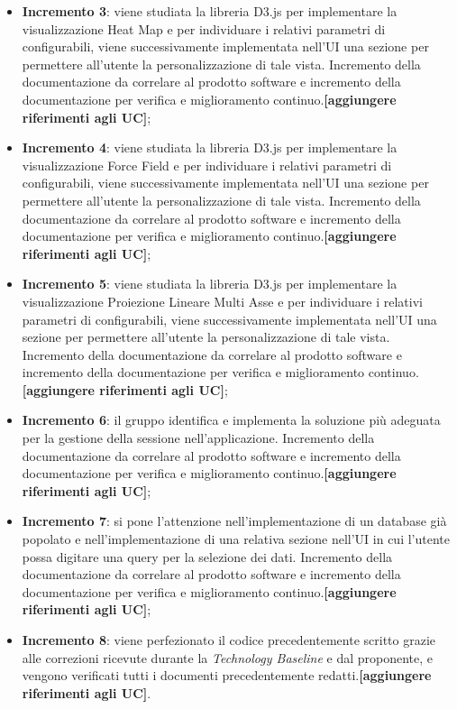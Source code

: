 \begin{itemize}
\begin{itemize}
	\item \textbf{Incremento 3}: viene studiata la libreria D3.js per implementare la visualizzazione Heat Map e per individuare i relativi parametri di configurabili, viene successivamente implementata nell'UI una sezione per permettere all'utente la personalizzazione di tale vista. Incremento della documentazione da correlare al prodotto software e incremento della documentazione per verifica e miglioramento continuo.\textbf{[aggiungere riferimenti agli UC]};
	
	\item \textbf{Incremento 4}: viene studiata la libreria D3.js per implementare la visualizzazione Force Field e per individuare i relativi parametri di configurabili, viene successivamente implementata nell'UI una sezione per permettere all'utente la personalizzazione di tale vista. Incremento della documentazione da correlare al prodotto software e incremento della documentazione per verifica e miglioramento continuo.\textbf{[aggiungere riferimenti agli UC]};
	
	\item \textbf{Incremento 5}: viene studiata la libreria D3.js per implementare la visualizzazione Proiezione Lineare Multi Asse e per individuare i relativi parametri di configurabili, viene successivamente implementata nell'UI una sezione per permettere all'utente la personalizzazione di tale vista. Incremento della documentazione da correlare al prodotto software e incremento della documentazione per verifica e miglioramento continuo.\textbf{[aggiungere riferimenti agli UC]};
	
	\item \textbf{Incremento 6}: il gruppo identifica e implementa la soluzione più adeguata per la gestione della sessione nell'applicazione. Incremento della documentazione da correlare al prodotto software e incremento della documentazione per verifica e miglioramento continuo.\textbf{[aggiungere riferimenti agli UC]};
	
	\item \textbf{Incremento 7}: si pone l'attenzione nell'implementazione di un database già popolato e nell'implementazione di una relativa sezione nell'UI in cui l'utente possa digitare una query per la selezione dei dati. Incremento della documentazione da correlare al prodotto software e incremento della documentazione per verifica e miglioramento continuo.\textbf{[aggiungere riferimenti agli UC]};
	
	\item \textbf{Incremento 8}: viene perfezionato il codice precedentemente scritto grazie alle correzioni ricevute durante la \textit{Technology Baseline} e dal proponente, e vengono verificati tutti i documenti precedentemente redatti.\textbf{[aggiungere riferimenti agli UC]}.
	\end{itemize}
\end{itemize}

